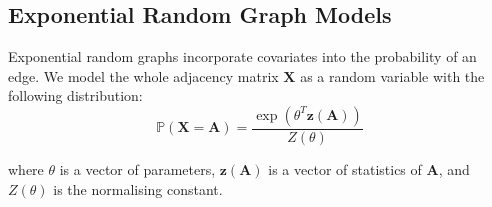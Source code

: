 \documentclass{article}
\begin{document}
\subsection{Exponential Random Graph Models}
Exponential random graphs incorporate covariates into the probability of an edge. We model the whole adjacency matrix $\mathbf{X}$ as a random variable with the following distribution:
\begin{equation*}
    \mathbb{P}(\mathbf{X}=\mathbf{A}) = \frac{\exp(\theta^T \mathbf{z}(\mathbf{A}))}{Z(\theta)}
\end{equation*}

where $\theta$ is a vector of parameters, $\mathbf{z}(\mathbf{A})$ is a vector of statistics of $\mathbf{A}$, and $Z(\theta)$ is the normalising constant. 


\newpage


\end{document}
